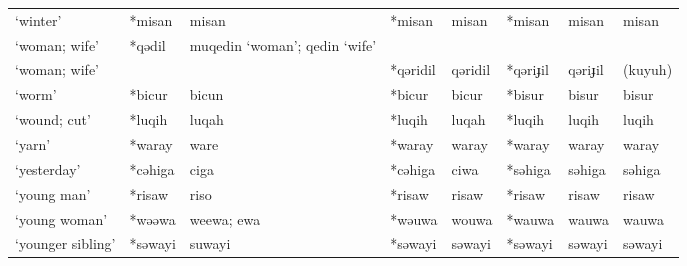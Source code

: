 \begin{landscape}
\begin{longtable}[c]{@{}p{3cm}<{\raggedright}p{2.75cm}<{\raggedright}p{2.75cm}<{\raggedright}p{2.75cm}<{\raggedright}p{2.75cm}<{\raggedright}p{2.75cm}<{\raggedright}p{2.75cm}<{\raggedright}p{2.75cm}<{\raggedright}@{}}
`winter'                                             & *misan             & misan                          & *misan             & misan                      & *misan           & misan                    & misan                             \\
`woman; wife' & *qədil & muqedin `woman'; qedin `wife' &          &         &          &         &         \\
`woman; wife' &        &                               & *qəridil & qəridil & *qəriɟil & qəriɟil & (kuyuh) \\
`worm'                                               & *bicur             & bicun                          & *bicur             & bicur                      & *bisur           & bisur                    & bisur                             \\
`wound; cut'                                         & *luqih             & luqah                          & *luqih             & luqah                      & *luqih           & luqih                    & luqih                             \\
`yarn'                                               & *waray             & ware                           & *waray             & waray                      & *waray           & waray                    & waray                             \\
`yesterday'                                          & *cəhiga            & ciga                           & *cəhiga            & ciwa                       & *səhiga          & səhiga                   & səhiga                            \\
`young man'                                          & *risaw             & riso                           & *risaw             & risaw                      & *risaw           & risaw                    & risaw                             \\
`young woman'                                        & *wəəwa             & weewa; ewa                     & *wəuwa             & wouwa                      & *wauwa           & wauwa                    & wauwa                             \\
`younger sibling'                                    & *səwayi            & suwayi                         & *səwayi            & səwayi                     & *səwayi          & səwayi                   & səwayi                           \\* 

\end{longtable}

        
\end{landscape}